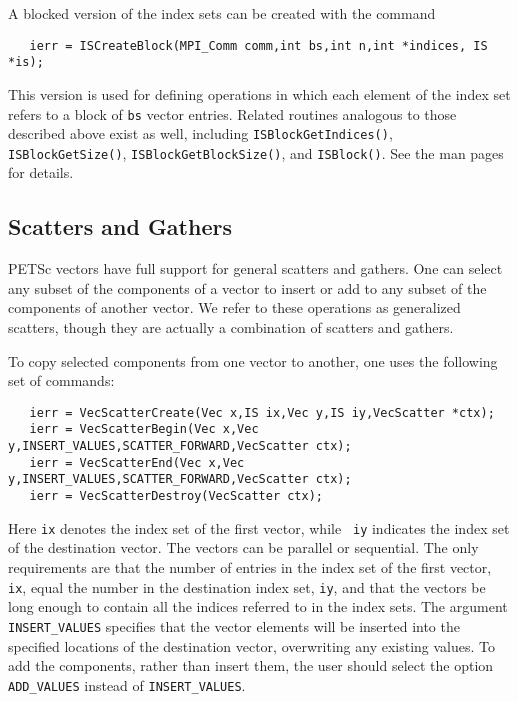 A blocked version of the index sets can be created with the command
\begin{verbatim}
   ierr = ISCreateBlock(MPI_Comm comm,int bs,int n,int *indices, IS *is);
\end{verbatim}
This version is used for defining operations in which each element of the index
set refers to a block of {\tt bs} vector entries.  Related routines analogous
to those described above exist as well, including
{\tt ISBlockGetIndices()}, {\tt ISBlockGetSize()}, {\tt ISBlockGetBlockSize()},
and {\tt ISBlock()}. See the man pages for details.
  

\subsection{Scatters and Gathers}  
\label{sec:scatter}

PETSc vectors have full support for general scatters and 
gathers. One can select any subset of the components of a vector to
insert or add to any subset of the components of another vector.
We refer to these operations as generalized scatters, though they are 
actually a combination of scatters and gathers. 

 
 
 
To copy selected components from one vector 
to another, one uses the following set of commands:
\begin{verbatim}
   ierr = VecScatterCreate(Vec x,IS ix,Vec y,IS iy,VecScatter *ctx);
   ierr = VecScatterBegin(Vec x,Vec y,INSERT_VALUES,SCATTER_FORWARD,VecScatter ctx);
   ierr = VecScatterEnd(Vec x,Vec y,INSERT_VALUES,SCATTER_FORWARD,VecScatter ctx);
   ierr = VecScatterDestroy(VecScatter ctx);
\end{verbatim} 
Here {\tt ix} denotes the index set of the first vector, while {\tt
iy} indicates the index set of the destination vector.  The vectors
can be parallel or sequential. The only requirements are that the
number of entries in the index set of the first vector, {\tt ix},
equal the number in the destination index set, {\tt iy}, and that the
vectors be long enough to contain all the indices referred to in the
index sets.  The argument {\tt INSERT\_VALUES} specifies that the
vector elements will be inserted into the specified locations of the
destination vector, overwriting any existing values.  To add the
components, rather than insert them, the user should select the option
{\tt ADD\_VALUES}  instead of {\tt INSERT\_VALUES}.

